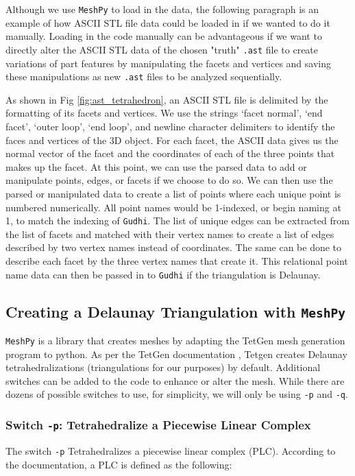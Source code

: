 \documentclass[ma]{uncgdissertationexp}
\theoremstyle{plain}
\theoremstyle{definition}
\theoremstyle{remark}
\begin{document}
\par Although we use \verb"MeshPy" to load in the data, the following paragraph is an example of how ASCII STL file data could be loaded in if we wanted to do it manually. Loading in the code manually can be advantageous if we want to directly alter the ASCII STL data of the chosen "truth" \verb".ast" file to create variations of part features by manipulating the facets and vertices and saving these manipulations as new \verb".ast" files to be analyzed sequentially.

\par As shown in Fig \ref{fig:ast_tetrahedron}, an ASCII STL file is delimited by the formatting of its facets and vertices. We use the strings `facet normal', `end facet', `outer loop', `end loop', and newline character delimiters to identify the faces and vertices of the 3D object. For each facet, the ASCII data gives us the normal vector of the facet and the coordinates of each of the three points that makes up the facet. At this point, we can use the parsed data to add or manipulate points, edges, or facets if we choose to do so. We can then use the parsed or manipulated data to create a list of points where each unique point is numbered numerically. All point names would be 1-indexed, or begin naming at 1, to match the indexing of \verb"Gudhi". The list of unique edges can be extracted from the list of facets and matched with their vertex names to create a list of edges described by two vertex names instead of coordinates. The same can be done to describe each facet by the three vertex names that create it. This relational point name data can then be passed in to \verb"Gudhi" if the triangulation is Delaunay.

\cprotect\subsection{Creating a Delaunay Triangulation with \verb+MeshPy+}
\label{sec:implement_meshpy}
\par \verb"MeshPy" is a library that creates meshes by adapting the TetGen mesh generation program to python. As per the TetGen documentation \cite{tetgen}, Tetgen creates Delaunay tetrahedralizations (triangulations for our purposes) by default. Additional switches can be added to the code to enhance or alter the mesh. While there are dozens of possible switches to use, for simplicity, we will only be using \verb"-p" and \verb"-q".
\newpage
\cprotect\subsubsection{Switch \verb+-p+: Tetrahedralize a Piecewise Linear Complex}
\par The switch \verb"-p" Tetrahedralizes a piecewise linear complex (PLC). According to the documentation, a PLC is defined as the following:
\end{document}
